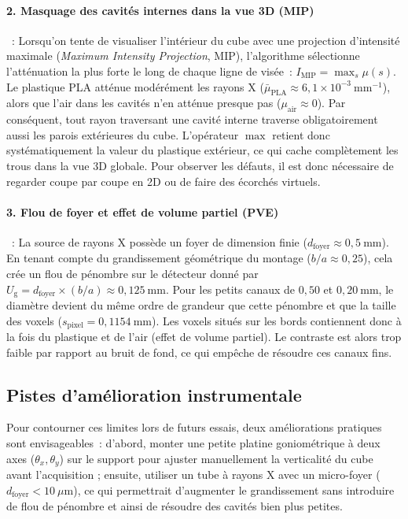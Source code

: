 \paragraph{2. Masquage des cavités internes dans la vue 3D (MIP)}~:
Lorsqu'on tente de visualiser l'intérieur du cube avec une projection d'intensité maximale (\emph{Maximum Intensity Projection}, MIP), l'algorithme sélectionne l'atténuation la plus forte le long de chaque ligne de visée~: $I_{\text{MIP}} = \max_s \mu(s)$. Le plastique PLA atténue modérément les rayons X ($\bar{\mu}_{\text{PLA}} \approx 6{,}1 \times 10^{-3}~\text{mm}^{-1}$), alors que l'air dans les cavités n'en atténue presque pas ($\mu_{\text{air}} \approx 0$). Par conséquent, tout rayon traversant une cavité interne traverse obligatoirement aussi les parois extérieures du cube. L'opérateur $\max$ retient donc systématiquement la valeur du plastique extérieur, ce qui cache complètement les trous dans la vue 3D globale. Pour observer les défauts, il est donc nécessaire de regarder coupe par coupe en 2D ou de faire des écorchés virtuels.

\paragraph{3. Flou de foyer et effet de volume partiel (PVE)}~:
La source de rayons X possède un foyer de dimension finie ($d_{\text{foyer}} \approx 0{,}5~\text{mm}$). En tenant compte du grandissement géométrique du montage ($b/a \approx 0{,}25$), cela crée un flou de pénombre sur le détecteur donné par $U_{\text{g}} = d_{\text{foyer}} \times (b/a) \approx 0{,}125~\text{mm}$. Pour les petits canaux de $0{,}50$ et $0{,}20~\text{mm}$, le diamètre devient du même ordre de grandeur que cette pénombre et que la taille des voxels ($s_{\text{pixel}} = 0{,}1154~\text{mm}$). Les voxels situés sur les bords contiennent donc à la fois du plastique et de l'air (effet de volume partiel). Le contraste est alors trop faible par rapport au bruit de fond, ce qui empêche de résoudre ces canaux fins.

\subsection{Pistes d'amélioration instrumentale}
Pour contourner ces limites lors de futurs essais, deux améliorations pratiques sont envisageables~: d'abord, monter une petite platine goniométrique à deux axes ($\theta_x, \theta_y$) sur le support pour ajuster manuellement la verticalité du cube avant l'acquisition ; ensuite, utiliser un tube à rayons X avec un micro-foyer ($d_{\text{foyer}} < 10~\mu\text{m}$), ce qui permettrait d'augmenter le grandissement sans introduire de flou de pénombre et ainsi de résoudre des cavités bien plus petites.
